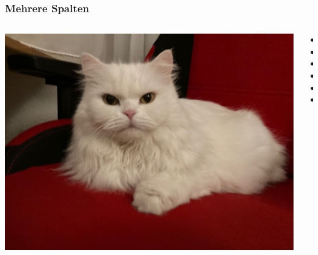 \documentclass[12pt,ngerman]{beamer}
\begin{document}
\begin{frame}
\frametitle{Mehrere Spalten}

\begin{columns}
\begin{column}{0.66\textwidth}
\includegraphics[width=\textwidth]{Sampledocument/Images/Katze}
\end{column}
\begin{column}{0.33\textwidth}
\begin{itemize}
	\item 
	\item 
	\item 
	\item 
	\item 
	\item 
\end{itemize}


\end{column}
\end{columns}

\end{frame}
\end{document}
